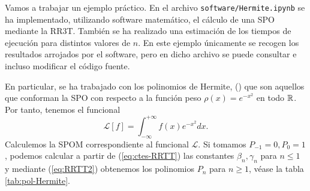 \begin{ejemplo}
    Vamos a trabajar un ejemplo práctico. En el archivo \texttt{software/Hermite.ipynb} se ha implementado, utilizando software matemático, el cálculo de una SPO mediante la RR3T. También se ha realizado una estimación de los tiempos de ejecución para distintos valores de $n$. En este ejemplo únicamente se recogen los resultados arrojados por el software, pero en dicho archivo se puede consultar e incluso modificar el código fuente.
    
    En particular, se ha trabajado con los polinomios de Hermite, () que son aquellos que conforman la SPO con respecto a la función peso $\rho(x)=e^{-x^2}$ en todo $\mathbb{R}$. Por tanto, tenemos el funcional
    $$
    \mathcal{L}[f] = \int_{-\infty}^{+\infty} f(x) e^{-x^2}dx.
    $$
    Calculemos la SPOM correspondiente al funcional $\mathcal L$. Si tomamos $P_{-1}=0, P_0=1$, podemos calcular a partir de (\ref{eq:ctes-RRTT}) las constantes $\beta_n,\gamma_n$ para $n\leq 1$ y mediante (\ref{eq:RRTT2}) obtenemos los polinomios $P_n$ para $n\geq 1$, véase la tabla \ref{tab:pol-Hermite}.


\end{ejemplo}
